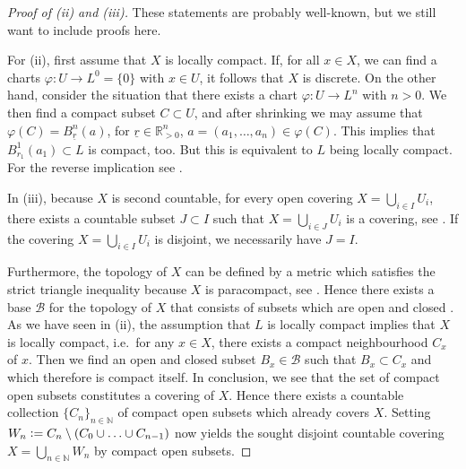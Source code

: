 \documentclass[a4paper, reqno, 10pt]{amsart}
\theoremstyle{definition}
\numberwithin{equation}{section}
\newcommand{\defeq}{\vcentcolon=}
\newcommand{\ra}{\rightarrow}
\newcommand{\ul}[1]{{\underline{#1}}}
\newcommand{\BN}{{\mathbb {N}}}
\newcommand{\BR}{{\mathbb {R}}}
\newcommand{\CB}{{\mathcal {B}}}
\begin{document}
\begin{proof}[Proof of (ii) and (iii)]
	These statements are probably well-known, but we still want to include proofs here.
	
	
	For (ii), first assume that $X$ is locally compact.
	If, for all $x\in X$, we can find a charts $\varphi\colon U \ra L^0=\{0\}$ with $x\in U$, it follows that $X$ is discrete.
	On the other hand, consider the situation that there exists a chart $\varphi\colon U \ra L^n$ with $n>0$.
	We then find a compact subset $C \subset U$, and after shrinking we may assume that $\varphi(C) = B^{n}_{\ul{r}}(a)$, for $\ul{r} \in \BR^n_{>0}$, $a=(a_1,\ldots,a_n)\in \varphi(C)$.
	This implies that $B^{1}_{r_1} (a_1) \subset L$ is compact, too.
	But this is equivalent to $L$ being locally compact.
	For the reverse implication see \cite[5.1.9]{Bourbaki07VarDiffAnFasciDeResult}.
	
	
	In (iii), because $X$ is second countable, for every open covering $X= \bigcup_{i\in I} U_i$, there exists a countable subset $J\subset I$ such that $X = \bigcup_{i\in J} U_i$ is a covering, see \cite[Ch.\ IX.\ \S 2.8 Prop.\ 13]{Bourbaki66GenTop2}.
	If the covering $X= \bigcup_{i\in I} U_i$ is disjoint, we necessarily have $J = I$.
	
	
	Furthermore, the topology of $X$ can be defined by a metric which satisfies the strict triangle inequality because $X$ is paracompact, see \cite[Prop.\ 8.7]{Schneider11pAdicLieGrps}.
	Hence there exists a base $\CB$ for the topology of $X$ that consists of subsets which are open and closed \cite[Ch.\ IX.\ Ex.\ for \S 6, Ex.\ 2a)]{Bourbaki66GenTop2}.
	As we have seen in (ii), the assumption that $L$ is locally compact implies that $X$ is locally compact, i.e.\ for any $x\in X$, there exists a compact neighbourhood $C_x$ of $x$.
	Then we find an open and closed subset $B_x \in \CB$ such that $B_x\subset C_x$ and which therefore is compact itself.
	In conclusion, we see that the set of compact open subsets constitutes a covering of $X$.
	Hence there exists a countable collection $\{C_n\}_{n\in \BN}$ of compact open subsets which already covers $X$.	
	Setting $W_n \defeq C_n \setminus (C_0 \cup \ldots \cup C_{n-1})$ now yields the sought disjoint countable covering $X=\bigcup_{n\in\BN} W_n$ by compact open subsets.
\end{proof}
\end{document}
